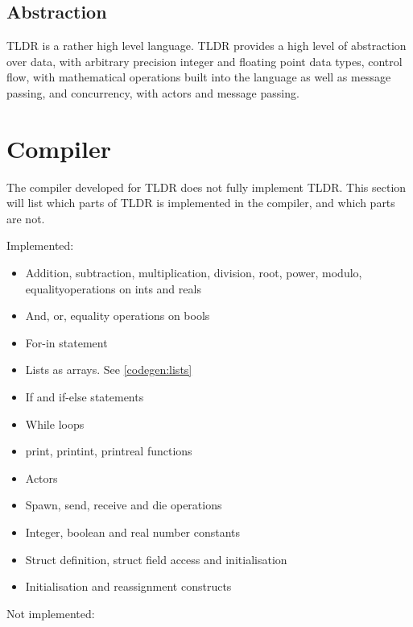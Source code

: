\subsection{Abstraction}
TLDR is a rather high level language. TLDR provides a high level of abstraction over data, with arbitrary precision integer and floating point data types, control flow, with mathematical operations built into the language as well as message passing, and concurrency, with actors and message passing.

\section{Compiler}

The compiler developed for TLDR does not fully implement TLDR. This section will list which parts of TLDR is implemented in the compiler, and which parts are not.


Implemented:

\begin{itemize}
\item Addition, subtraction, multiplication, division, root, power, modulo, equalityoperations on ints and reals
\item And, or, equality operations on bools
\item For-in statement
\item Lists as arrays. See \cref{codegen:lists}
\item If and if-else statements
\item While loops
\item print, printint, printreal functions
\item Actors
\item Spawn, send, receive and die operations
\item Integer, boolean and real number constants
\item Struct definition, struct field access and initialisation
\item Initialisation and reassignment constructs
\end{itemize}

Not implemented:


